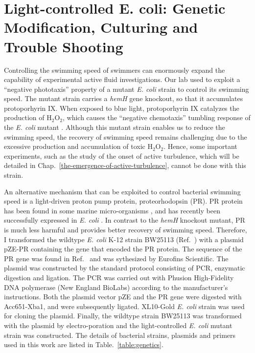 \section{Light-controlled E. coli: Genetic Modification, Culturing and Trouble Shooting}
\label{light-controlled-E-coli-genetic-modification-culturing-and-trouble-shooting}
Controlling the swimming speed of swimmers can enormously expand the capability of experimental active fluid investigations. Our lab used to exploit a ``negative phototaxis'' property of a mutant \textit{E. coli} strain to control its swimming speed. The mutant strain carries a \textit{hemH} gene knockout, so that it accumulates protoporhyrin IX. When exposed to blue light, protoporhyrin IX catalyzes the production of H$_2$O$_2$, which causes the ``negative chemotaxis'' tumbling response of the \textit{E. coli} mutant \cite{Yang1995}. Although this mutant strain enables us to reduce the swimming speed, the recovery of swimming speed remains challenging due to the excessive production and accumulation of toxic H$_2$O$_2$. Hence, some important experiments, such as the study of the onset of active turbulence, which will be detailed in Chap.~\ref{the-emergence-of-active-turbulence}, cannot be done with this strain.

An alternative mechanism that can be exploited to control bacterial swimming speed is a light-driven proton pump protein, proteorhodopsin (PR). PR protein has been found in some marine micro-organisms \cite{Beja2000, DelaTorre2003}, and has recently been successfully expressed in \textit{E. coli} \cite{Walter2007}. In contrast to the \textit{hemH} knockout mutant, PR is much less harmful and provides better recovery of swimming speed. Therefore, I transformed the wildtype \textit{E. coli} K-12 strain BW25113 (Ref.~\cite{Datsenko2000}) with a plasmid pZE-PR containing the gene that encoded the PR protein. The sequence of the PR gene was found in Ref.~\cite{DelaTorre2003} and was sythesized by Eurofins Scientific.
The plasmid was constructed by the standard protocol consisting of PCR, enzymatic digestion and ligation. The PCR was carried out with Phusion High-Fidelity DNA polymerase (New England BioLabs) according to the manufacturer's instructions. Both the plasmid vector pZE and the PR gene were digested with Acc651-Xba1, and were subsequently ligated. XL10-Gold \textit{E. coli} strain was used for cloning the plasmid. Finally, the wildtype strain BW25113 was transformed with the plasmid by electro-poration and the light-controlled \textit{E. coli} mutant strain was constructed. The details of bacterial strains, plasmids and primers used in this work are listed in Table.~\ref{table:genetics}.

